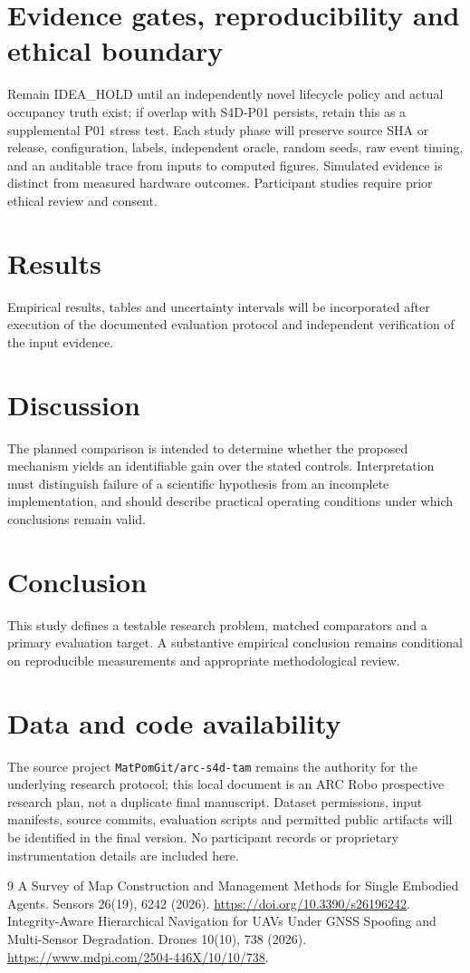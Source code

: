 \documentclass[11pt,a4paper]{article}
\begin{document}
\section{Evidence gates, reproducibility and ethical boundary}
Remain IDEA\_HOLD until an independently novel lifecycle policy and actual occupancy truth exist; if overlap with S4D-P01 persists, retain this as a supplemental P01 stress test. Each study phase will preserve source SHA or release, configuration, labels, independent oracle, random seeds, raw event timing, and an auditable trace from inputs to computed figures. Simulated evidence is distinct from measured hardware outcomes. Participant studies require prior ethical review and consent.

\section{Results}
Empirical results, tables and uncertainty intervals will be incorporated after execution of the documented evaluation protocol and independent verification of the input evidence.

\section{Discussion}
The planned comparison is intended to determine whether the proposed mechanism yields an identifiable gain over the stated controls. Interpretation must distinguish failure of a scientific hypothesis from an incomplete implementation, and should describe practical operating conditions under which conclusions remain valid.

\section{Conclusion}
This study defines a testable research problem, matched comparators and a primary evaluation target. A substantive empirical conclusion remains conditional on reproducible measurements and appropriate methodological review.

\section{Data and code availability}
The source project \texttt{MatPomGit/arc-s4d-tam} remains the authority for the underlying research protocol; this local document is an ARC Robo prospective research plan, not a duplicate final manuscript. Dataset permissions, input manifests, source commits, evaluation scripts and permitted public artifacts will be identified in the final version. No participant records or proprietary instrumentation details are included here.
\begin{thebibliography}{9}
 A Survey of Map Construction and Management Methods for Single Embodied Agents. Sensors 26(19), 6242 (2026). \url{https://doi.org/10.3390/s26196242}.
 Integrity-Aware Hierarchical Navigation for UAVs Under GNSS Spoofing and Multi-Sensor Degradation. Drones 10(10), 738 (2026). \url{https://www.mdpi.com/2504-446X/10/10/738}.
\end{thebibliography}
\end{document}
